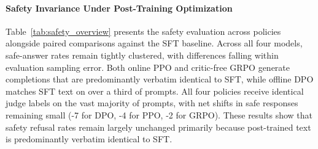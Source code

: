 \documentclass{article}
\begin{document}
\begin{table}[t]
\centering
\caption{Safety calibration and refusal behavior across policies on XSTest ($N = 450$; 250 safe, 200 unsafe). Safe JR Share measures benign prompts labeled as justified refusals by the judge. The 3B judge never emitted \texttt{OVER\_REFUSAL} or \texttt{AMBIGUOUS} (0.0\%), and never emitted \texttt{UNSAFE\_COMPLIANCE} on unsafe prompts (0.0\%).}
\label{tab:safety_overview}
\end{table}

\paragraph{Safety Invariance Under Post-Training Optimization}
Table~\ref{tab:safety_overview} presents the safety evaluation across policies alongside paired comparisons against the SFT baseline. Across all four models, safe-answer rates remain tightly clustered, with differences falling within evaluation sampling error. Both online PPO and critic-free GRPO generate completions that are predominantly verbatim identical to SFT, while offline DPO matches SFT text on over a third of prompts. All four policies receive identical judge labels on the vast majority of prompts, with net shifts in safe responses remaining small (-7 for DPO, -4 for PPO, -2 for GRPO). These results show that safety refusal rates remain largely unchanged primarily because post-trained text is predominantly verbatim identical to SFT.
\end{document}
